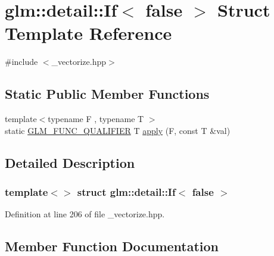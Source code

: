 \hypertarget{structglm_1_1detail_1_1_if_3_01false_01_4}{}\section{glm\+:\+:detail\+:\+:If$<$ false $>$ Struct Template Reference}
\label{structglm_1_1detail_1_1_if_3_01false_01_4}


{\ttfamily \#include $<$\+\_\+vectorize.\+hpp$>$}

\subsection*{Static Public Member Functions}
\begin{DoxyCompactItemize}
\item 
{\footnotesize template$<$typename F , typename T $>$ }\\static \hyperlink{setup_8hpp_a33fdea6f91c5f834105f7415e2a64407}{G\+L\+M\+\_\+\+F\+U\+N\+C\+\_\+\+Q\+U\+A\+L\+I\+F\+I\+ER} T \hyperlink{structglm_1_1detail_1_1_if_3_01false_01_4_a31a9409e47dc11cb7d4251c12342b9f6}{apply} (F, const T \&val)
\end{DoxyCompactItemize}


\subsection{Detailed Description}
\subsubsection*{template$<$$>$\newline
struct glm\+::detail\+::\+If$<$ false $>$}



Definition at line 206 of file \+\_\+vectorize.\+hpp.



\subsection{Member Function Documentation}
\mbox{\label{structglm_1_1detail_1_1_if_3_01false_01_4_a31a9409e47dc11cb7d4251c12342b9f6}} 
